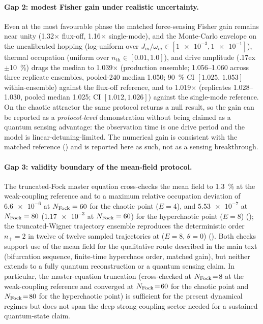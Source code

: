 \documentclass[preprint,numbers,a4paper]{elsarticle}
\begin{document}
\paragraph{Gap 2: modest Fisher gain under realistic uncertainty.}
Even at the most favourable phase the matched force-sensing Fisher gain remains near unity (\num{1.32}$\times$ flux-off, \num{1.16}$\times$ single-mode), and the Monte-Carlo envelope on the uncalibrated hopping (log-uniform over $J_m/\omega_m\in[\num{1e-3},\num{1e-1}]$), thermal occupation (uniform over $n_{\mathrm{th}}\in[\num{0.01},\num{1.0}]$), and drive amplitude ({\raise.17ex\hbox{$\scriptstyle\pm$}}\qty{10}{\percent}) drags the median to \num{1.039}$\times$ (production ensemble; \num{1.056}--\num{1.060} across three replicate ensembles, pooled-\num{240} median \num{1.050}; \qty{90}{\percent} CI $[1.025,\,1.053]$ within-ensemble) against the flux-off reference, and to \num{1.019}$\times$ (replicates \num{1.028}--\num{1.030}, pooled median \num{1.025}; CI $[\num{1.012},\num{1.026}]$) against the single-mode reference. On the chaotic attractor the same protocol returns a null result, so the gain can be reported as a \emph{protocol-level} demonstration without being claimed as a quantum sensing advantage: the observation time is one drive period and the model is linear-detuning-limited. The numerical gain is consistent with the matched reference () and is reported here as such, not as a sensing breakthrough.

\paragraph{Gap 3: validity boundary of the mean-field protocol.}
The truncated-Fock master equation cross-checks the mean field to \qty{1.3}{\percent} at the weak-coupling reference and to a maximum relative occupation deviation of $\num{6.6e-6}$ at $N_{\rm Fock}=\num{60}$ for the chaotic point ($E=\num{4}$), and $\num{5.53e-7}$ at $N_{\rm Fock}=\num{80}$ ($\num{1.17e-3}$ at $N_{\rm Fock}=\num{60}$) for the hyperchaotic point ($E=\num{8}$) (); the truncated-Wigner trajectory ensemble reproduces the deterministic order $n_+\!=\!2$ in twelve of twelve sampled trajectories at ($E=\num{8}$, $\theta=0$) (). Both checks support use of the mean field for the qualitative route described in the main text (bifurcation sequence, finite-time hyperchaos order, matched gain), but neither extends to a fully quantum reconstruction or a quantum sensing claim. In particular, the master-equation truncation (cross-checked at $N_{\rm Fock}\!=\!8$ at the weak-coupling reference and converged at $N_{\rm Fock}\!=\!60$ for the chaotic point and $N_{\rm Fock}\!=\!80$ for the hyperchaotic point) is sufficient for the present dynamical regimes but does not span the deep strong-coupling sector needed for a sustained quantum-state claim.
\end{document}
